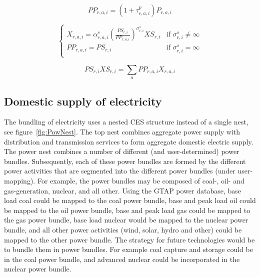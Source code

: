 \documentclass[11pt,letterpaper]{report}
\begin{document}
\begin{equation}
\label{eq:pp}
\mathit{PP}_{r,a,i} =
   \left( 1 + \tau^p_{r,a,i} \right) \mathit{P}_{r,a,i}
\end{equation}

\begin{equation}
\label{eq:p}
\begin{cases}
   \mathit{X}_{r,a,i} =
      \displaystyle
         \alpha^{\mathit{s}}_{r,a,i}
         \left( \frac {\mathit{PS}_{r,i}} {\mathit{PP}_{r,a,i}}
         \right)^{\sigma^{\mathit{s}}_{r,i}}
         \mathit{XS}_{r,i}
   & \textrm{if } \sigma^{\mathit{s}}_{r,i} \ne \infty \\
   \mathit{PP}_{r,a,i} = \mathit{PS}_{r,i}
   & \textrm{if } \sigma^{\mathit{s}}_{r,i} = \infty \\
\end{cases}
\end{equation}

\begin{equation}
\label{eq:ps}
\mathit{PS}_{r,i} \mathit{XS}_{r,i} =
   \sum_a{
      \mathit{PP}_{r,a,i} \mathit{X}_{r,a,i}
   }
\end{equation}

\subsection{Domestic supply of electricity}

The bundling of electricity uses a nested CES structure instead of a single
nest, see figure~\ref{fig:PowNest}. The top nest combines aggregate power supply
with distribution and transmission services to form aggregate domestic electric
supply. The power nest combines a number of different (and user-determined)
power bundles. Subsequently, each of these power bundles are formed by the
different power activities that are segmented into the different power bundles
(under user-mapping). For example, the power bundles may be composed of coal-,
oil- and gas-generation, nuclear, and all other. Using the GTAP power database,
base load coal could be mapped to the coal power bundle, base and peak load oil
could be mapped to the oil power bundle, base and peak load gas could be mapped
to the gas power bundle, base load nuclear would be mapped to the nuclear power
bundle, and all other power activities (wind, solar, hydro and other) could be
mapped to the other power bundle. The strategy for future technologies would be
to bundle them in power bundles. For example coal capture and storage could be
in the coal power bundle, and advanced nuclear could be incorporated in the
nuclear power bundle.
\end{document}
